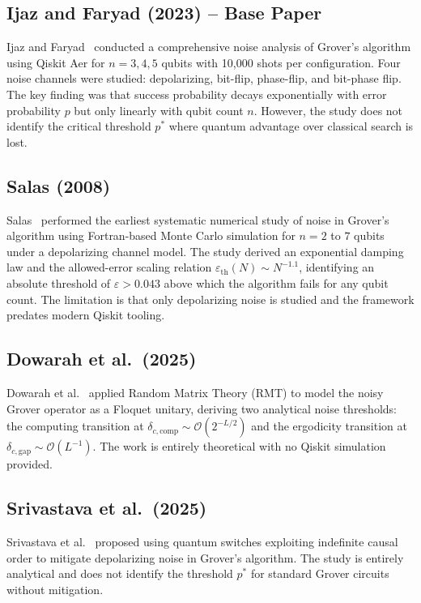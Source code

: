 \documentclass[conference]{IEEEtran}
\begin{document}
\subsection{Ijaz and Faryad (2023) -- Base Paper}

Ijaz and Faryad~\cite{ijaz2023} conducted a comprehensive noise analysis of
Grover's algorithm using Qiskit Aer for $n = 3, 4, 5$ qubits with 10{,}000 shots
per configuration. Four noise channels were studied: depolarizing, bit-flip,
phase-flip, and bit-phase flip. The key finding was that success probability decays
exponentially with error probability $p$ but only linearly with qubit count $n$.
However, the study does not identify the critical threshold $p^{*}$ where quantum
advantage over classical search is lost.

\subsection{Salas (2008)}

Salas~\cite{salas2008} performed the earliest systematic numerical study of noise
in Grover's algorithm using Fortran-based Monte Carlo simulation for $n = 2$ to
$7$ qubits under a depolarizing channel model. The study derived an exponential
damping law and the allowed-error scaling relation
$\varepsilon_{\text{th}}(N) \sim N^{-1.1}$, identifying an absolute threshold of
$\varepsilon > 0.043$ above which the algorithm fails for any qubit count. The
limitation is that only depolarizing noise is studied and the framework predates
modern Qiskit tooling.

\subsection{Dowarah et al.\ (2025)}

Dowarah et al.~\cite{dowarah2025} applied Random Matrix Theory (RMT) to model the
noisy Grover operator as a Floquet unitary, deriving two analytical noise
thresholds: the computing transition at $\delta_{c,\text{comp}} \sim
\mathcal{O}(2^{-L/2})$ and the ergodicity transition at $\delta_{c,\text{gap}}
\sim \mathcal{O}(L^{-1})$. The work is entirely theoretical with no Qiskit
simulation provided.

\subsection{Srivastava et al.\ (2025)}

Srivastava et al.~\cite{srivastava2025} proposed using quantum switches exploiting
indefinite causal order to mitigate depolarizing noise in Grover's algorithm. The
study is entirely analytical and does not identify the threshold $p^{*}$ for
standard Grover circuits without mitigation.
\end{document}
